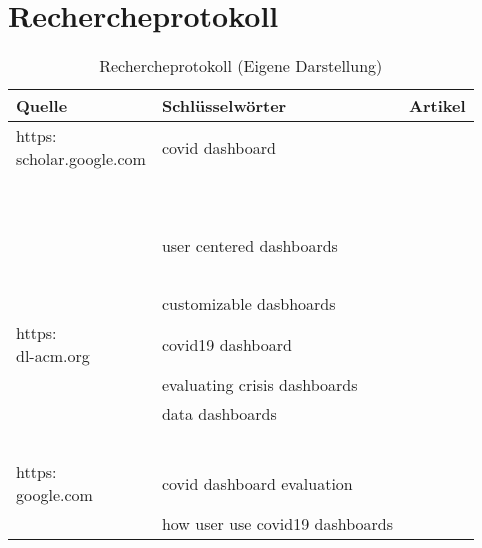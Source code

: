 \section{Rechercheprotokoll}
\begin{table}[ht]
	\begin{tabular}{@{}p{4cm}p{4cm}p{6.5cm}@{}}
		\toprule
		\textbf{Quelle} & \textbf{Schlüsselwörter}        & \textbf{Artikel}        \\ \midrule
		\url{https:                                                                 \\scholar.google.com}                         & covid dashboard                 & ~\citep{dong}         \\ \midrule
		                &                                 & ~\citep{florez}    \\ \midrule
		                &                                 & ~\citep{berry}     \\ \midrule
		                & user centered dashboards        & ~\citep{francois}  \\ \midrule
		                &                                 & ~\citep{young}     \\ \midrule
		                & customizable dasbhoards         & ~\citep{roberts}   \\ \midrule
		\url{https:                                                                 \\dl-acm.org}                                 & covid19 dashboard               & ~\citep{vitale}           \\ \midrule
		                & evaluating crisis dashboards    & ~\citep{ivanov}    \\ \midrule
		                & data dashboards                 & ~\citep{maheshwari.}    \\ \midrule
		                &                                 & ~\citep{beheshti}      \\ \midrule
		\url{https:                                                                 \\google.com}                                 & covid dashboard evaluation      & ~\citep{barbazza}         \\ \midrule
		                & how user use covid19 dashboards & ~\citep{ivankovic} \\ \bottomrule
	\end{tabular}
	\caption{\label{tab:research-protocol}Rechercheprotokoll (Eigene Darstellung)}
\end{table}